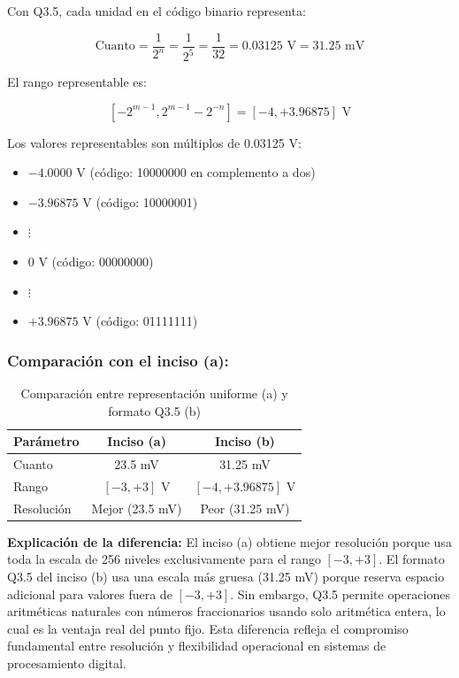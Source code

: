 \documentclass[12pt]{article}
\begin{document}
Con Q3.5, cada unidad en el código binario representa:
 
\begin{equation}
\text{Cuanto} = \frac{1}{2^n} = \frac{1}{2^5} = \frac{1}{32} = 0.03125 \text{ V} = 31.25 \text{ mV}
\end{equation}
 
El rango representable es:
 
\begin{equation}
\left[-2^{m-1}, 2^{m-1} - 2^{-n}\right] = [-4, +3.96875] \text{ V}
\end{equation}
 
Los valores representables son múltiplos de 0.03125 V:
\begin{itemize}
    \item $-4.0000$ V (código: 10000000 en complemento a dos)
    \item $-3.96875$ V (código: 10000001)
    \item $\vdots$
    \item 0 V (código: 00000000)
    \item $\vdots$
    \item $+3.96875$ V (código: 01111111)
\end{itemize}
 
\subsubsection*{Comparación con el inciso (a):}
 
\begin{table}[H]
\centering
\begin{tabular}{lcc}
\toprule
\textbf{Parámetro} & \textbf{Inciso (a)} & \textbf{Inciso (b)} \\
\midrule
Cuanto & 23.5 mV & 31.25 mV \\
Rango & {$[-3, +3]$ V} & {$[-4, +3.96875]$ V} \\
Resolución & Mejor (23.5 mV) & Peor (31.25 mV) \\
\bottomrule
\end{tabular}
\caption{Comparación entre representación uniforme (a) y formato Q3.5 (b)}
\end{table}
 
\textbf{Explicación de la diferencia:} El inciso (a) obtiene mejor resolución porque usa toda la escala de 256 niveles exclusivamente para el rango $[-3, +3]$. El formato Q3.5 del inciso (b) usa una escala más gruesa (31.25 mV) porque reserva espacio adicional para valores fuera de $[-3, +3]$. Sin embargo, Q3.5 permite operaciones aritméticas naturales con números fraccionarios usando solo aritmética entera, lo cual es la ventaja real del punto fijo. Esta diferencia refleja el compromiso fundamental entre resolución y flexibilidad operacional en sistemas de procesamiento digital.
 
\end{document}
